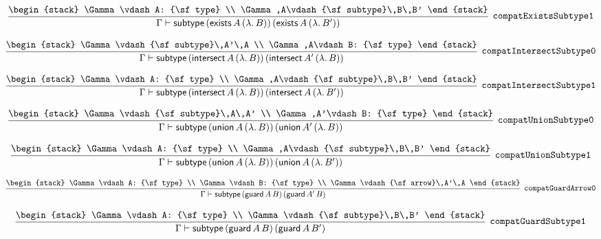 \[
\infer[{\tt compatExistsSubtype1}]{\Gamma \vdash {\sf subtype}\,({\sf exists}\,A\,(\lambda .\,B))\,({\sf exists}\,A\,(\lambda .\,B'))}{
\begin{stack}
\Gamma \vdash A: {\sf type}
\\
\Gamma ,A\vdash {\sf subtype}\,B\,B'
\end{stack}}
\]

\[
\infer[{\tt compatIntersectSubtype0}]{\Gamma \vdash {\sf subtype}\,({\sf intersect}\,A\,(\lambda .\,B))\,({\sf intersect}\,A'\,(\lambda .\,B))}{
\begin{stack}
\Gamma \vdash {\sf subtype}\,A'\,A
\\
\Gamma ,A\vdash B: {\sf type}
\end{stack}}
\]

\[
\infer[{\tt compatIntersectSubtype1}]{\Gamma \vdash {\sf subtype}\,({\sf intersect}\,A\,(\lambda .\,B))\,({\sf intersect}\,A\,(\lambda .\,B'))}{
\begin{stack}
\Gamma \vdash A: {\sf type}
\\
\Gamma ,A\vdash {\sf subtype}\,B\,B'
\end{stack}}
\]

\[
\infer[{\tt compatUnionSubtype0}]{\Gamma \vdash {\sf subtype}\,({\sf union}\,A\,(\lambda .\,B))\,({\sf union}\,A'\,(\lambda .\,B))}{
\begin{stack}
\Gamma \vdash {\sf subtype}\,A\,A'
\\
\Gamma ,A'\vdash B: {\sf type}
\end{stack}}
\]

\[
\infer[{\tt compatUnionSubtype1}]{\Gamma \vdash {\sf subtype}\,({\sf union}\,A\,(\lambda .\,B))\,({\sf union}\,A\,(\lambda .\,B'))}{
\begin{stack}
\Gamma \vdash A: {\sf type}
\\
\Gamma ,A\vdash {\sf subtype}\,B\,B'
\end{stack}}
\]

\[
\infer[{\tt compatGuardArrow0}]{\Gamma \vdash {\sf subtype}\,({\sf guard}\,A\,B)\,({\sf guard}\,A'\,B)}{
\begin{stack}
\Gamma \vdash A: {\sf type}
\\
\Gamma \vdash B: {\sf type}
\\
\Gamma \vdash {\sf arrow}\,A'\,A
\end{stack}}
\]

\[
\infer[{\tt compatGuardSubtype1}]{\Gamma \vdash {\sf subtype}\,({\sf guard}\,A\,B)\,({\sf guard}\,A\,B')}{
\begin{stack}
\Gamma \vdash A: {\sf type}
\\
\Gamma \vdash {\sf subtype}\,B\,B'
\end{stack}}
\]

